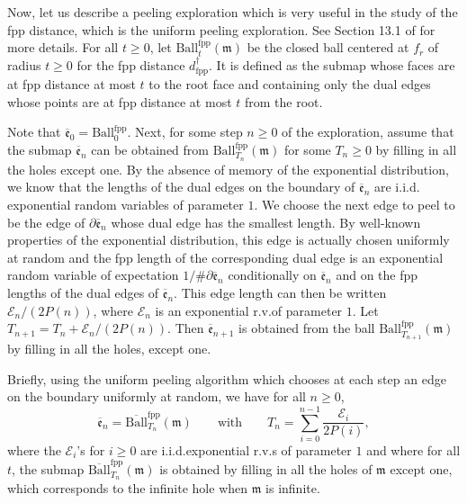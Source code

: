 \documentclass[11pt]{article}
\numberwithin{equation}{section}
\begin{document}
Now, let us describe a peeling exploration which is very useful in the study of the fpp distance, which is the uniform peeling exploration. See Section 13.1 of \cite{StFlour} for more details. For all $t\ge 0$, let $\mathrm{Ball}^{\mathrm{fpp}}_t (\mathfrak{m})$ be the closed ball centered at $f_r$ of radius $t\ge0$ for the fpp distance $d^\dagger_{\mathrm{fpp}}$. It is defined as the submap whose faces are at fpp distance at most $t$ to the root face and containing only the dual edges whose points are at fpp distance at most $t$ from the root. 

Note that $\overline{\mathfrak{e}}_0 = \mathrm{Ball}^{\mathrm{fpp}}_0$. Next, for some step $n\ge 0$ of the exploration, assume that the submap $\overline{\mathfrak{e}}_n $ can be obtained from $\mathrm{Ball}^{\mathrm{fpp}}_{T_n} (\mathfrak{m})$ for some $T_n \ge 0$ by filling in all the holes except one. By the absence of memory of the exponential distribution, we know that the lengths of the dual edges on the boundary of $\overline{\mathfrak{e}}_n $ are i.i.d. exponential random variables of parameter $1$. We choose the next edge to peel to be the edge of $\partial \overline{\mathfrak{e}}_n$ whose dual edge has the smallest length. By well-known properties of the exponential distribution, this edge is actually chosen uniformly at random and the fpp length of the corresponding dual edge is an exponential random variable of expectation $1/\# \partial \overline{\mathfrak{e}}_n$ conditionally on $\overline{\mathfrak{e}}_n $ and on the fpp lengths of the dual edges of $\overline{\mathfrak{e}}_n $. This edge length can then be written $\mathcal{E}_n/(2P(n))$, w{h}ere $\mathcal{E}_n$ is an exponential r.v.\@ of parameter $1$. Let $T_{n+1} = T_n +\mathcal{E}_n /(2P(n))$. Then $\overline{\mathfrak{e}}_{n+1} $ is obtained from the ball $\mathrm{Ball}^{\mathrm{fpp}}_{T_{n+1}} (\mathfrak{m})$ by filling in all the holes, except one.

{Briefly}, using the uniform peeling algorithm which chooses at each step an edge on the boundary uniformly at random, we have for all $n \ge 0$, 
$$
\overline{\mathfrak{e}}_n = \overline{\mathrm{Ball}}^{\mathrm{fpp}}_{T_n}(\mathfrak{m})
\qquad
\text{with}
\qquad
T_n = \sum_{i=0}^{n-1} \frac{\mathcal{E}_i}{2P(i)},
$$
where the $\mathcal{E}_i$'s for $i\ge 0$ are i.i.d.\@ exponential r.v.s of parameter $1$ and where for all $t$, the submap $\overline{\mathrm{Ball}}^{\mathrm{fpp}}_{T_n}(\mathfrak{m})$ is obtained by filling in all the holes of $\mathfrak{m}$ except one, which corresponds to the infinite hole when $\mathfrak{m}$ is infinite.
\end{document}
